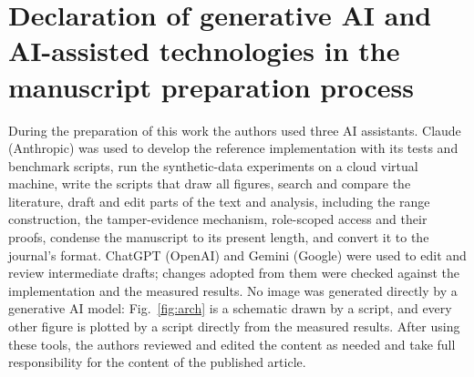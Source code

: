 \documentclass[a4paper,fleqn]{cas-sc}
\begin{document}
\section*{Declaration of generative AI and AI-assisted technologies in the
manuscript preparation process}
During the preparation of this work the authors used three AI assistants.
Claude (Anthropic) was used to develop the reference implementation with its
tests and benchmark scripts, run the synthetic-data experiments on a cloud
virtual machine, write the scripts that draw all figures, search
and compare the literature,
draft and edit parts of the text and analysis, including the range
construction, the tamper-evidence mechanism, role-scoped access and their
proofs, condense the manuscript to its present length, and convert it to the
journal's format. ChatGPT (OpenAI) and Gemini (Google) were used to edit and
review intermediate drafts; changes adopted from them were checked against the
implementation and the measured results. No image was generated directly by a
generative AI model: Fig.~\ref{fig:arch} is a schematic drawn by a script, and
every other figure is plotted by a script directly from the measured results. After using these tools, the authors reviewed and edited the content
as needed and take full responsibility for the content of the published
article.



\end{document}
